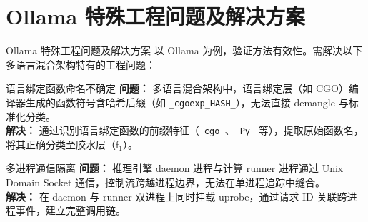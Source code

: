 \documentclass[aspectratio=169, 10pt]{beamer}
\begin{document}
\section{Ollama 特殊工程问题及解决方案}
\begin{frame}{Ollama 特殊工程问题及解决方案}
    以 Ollama 为例，验证方法有效性。需解决以下多语言混合架构特有的工程问题：

    \begin{block}{语言绑定函数命名不确定}
        \textbf{问题：} 多语言混合架构中，语言绑定层（如 CGO）编译器生成的函数符号含哈希后缀（如 \texttt{\_cgoexp\_HASH\_}），无法直接 demangle 与标准化分类。\\
        \textbf{解决：} 通过识别语言绑定函数的前缀特征（\texttt{\_cgo\_}、\texttt{\_Py\_} 等），提取原始函数名，将其正确分类至胶水层（f$_1$）。
    \end{block}

    \begin{block}{多进程通信隔离}
        \textbf{问题：} 推理引擎 daemon 进程与计算 runner 进程通过 Unix Domain Socket 通信，控制流跨越进程边界，无法在单进程追踪中缝合。\\
        \textbf{解决：} 在 daemon 与 runner 双进程上同时挂载 uprobe，通过请求 ID 关联跨进程事件，建立完整调用链。
    \end{block}
\end{frame}

\end{document}
